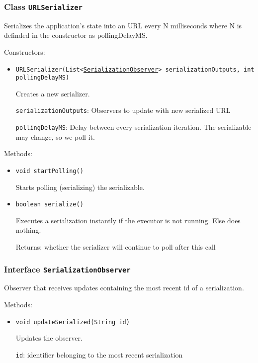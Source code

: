 \subsubsection{Class \texttt{URLSerializer}}
\label{type:edu.kit.wavelength.client.view.URLSerializer}
Serializes the application's state into an URL every N milliseconds where N
 is definded in the constructor as pollingDelayMS.

Constructors:
\begin{itemize}
\item \texttt{URLSerializer(List<\hyperref[type:edu.kit.wavelength.client.view.SerializationObserver]{SerializationObserver}> serializationOutputs, int pollingDelayMS)}

Creates a new serializer.

\texttt{serializationOutputs}: Observers to update with new serialized URL

\texttt{pollingDelayMS}: Delay between every serialization iteration. The serializable may
            change, so we poll it.

\end{itemize}

Methods:
\begin{itemize}
\item \texttt{void startPolling()}

Starts polling (serializing) the serializable.

\item \texttt{boolean serialize()}

Executes a serialization instantly if the executor is not running. Else does
 nothing.

Returns: whether the serializer will continue to poll after this call

\end{itemize}

\subsubsection{Interface \texttt{SerializationObserver}}
\label{type:edu.kit.wavelength.client.view.SerializationObserver}
Observer that receives updates containing the most recent id of a
 serialization.

Methods:
\begin{itemize}
\item \texttt{void updateSerialized(String id)}

Updates the observer.

\texttt{id}: identifier belonging to the most recent serialization

\end{itemize}

